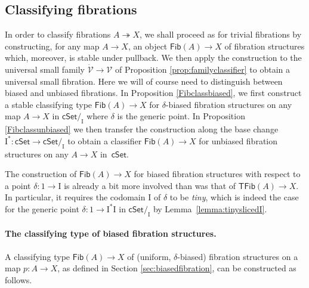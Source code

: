 \documentclass[11pt]{amsart}
\newcommand{\cSet}{\ensuremath{\mathsf{cSet}}}
\newcommand{\ra}{\ensuremath{\rightarrow}}
\newcommand{\fib}{\ensuremath{\twoheadrightarrow}}
\renewcommand{\to}{\ensuremath{\rightarrow}}
\newcommand{\I}{\ensuremath{\mathrm{I}}}
\newcommand{\V}{\ensuremath{\mathcal{V}}}
\newcommand{\VV}{\ensuremath{\dot{\mathcal{V}}}}
\newcommand{\Fib}{\ensuremath{\mathsf{Fib}}}
\newcommand{\TFib}{\ensuremath{\mathsf{TFib}}}
\theoremstyle{remark}
\theoremstyle{definition}
\begin{document}
\subsection{Classifying fibrations}\label{sec:universalfibration}

In order to classify fibrations $A\fib X$, we shall proceed as for trivial fibrations by constructing, for any map $A\ra X$, an object $\Fib(A)\to X$ of fibration structures which, moreover, is stable under pullback.  We then apply the construction to the universal small family $\VV\ra\V$ of Proposition \ref{prop:familyclassifier} to obtain a universal small fibration.    Here we will of course need to distinguish between biased and unbiased fibrations.  In Proposition \ref{Fibclassbiased}, we first construct a stable classifying type $\Fib(A)\ra X$ for $\delta$-biased fibration structures on any map $A\to X$ in $\cSet/_\I$ where $\delta$ is the generic point.    In Proposition \ref{Fibclassunbiased} we then transfer the construction along the base change $\I^* : \cSet \to \cSet/_\I$ to obtain a classifier $\Fib(A)\ra X$ for unbiased fibration structures on any $A\to X$ in~$\cSet$.

The construction of $\Fib(A)\ra X$ for biased fibration structures with respect to a point $\delta : 1\to \I$ is already a bit more involved than was that of $\TFib(A)\ra X$.  In particular, it requires the codomain $\I$ of $\delta$ to be \emph{tiny}, which is indeed the case for the generic point $\delta : 1 \to  \I^*\I$ in $\cSet/_\I$ by Lemma~\ref{lemma:tinyslicedI}.

\paragraph{The classifying type of biased fibration structures.}

A classifying type $\Fib(A)\ra X$ of (uniform, $\delta$-biased) fibration structures on a map $p: A\ra X$, 
as defined in Section \ref{sec:biasedfibration}, can be constructed as follows.
\end{document}
